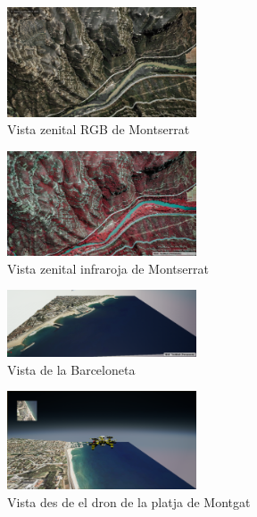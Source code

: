 \documentclass[10pt,a4paper,twocolumn,twoside]{article}
\begin{document}
\begin{figure}[!h]
\centering
  	\includegraphics[width=0.5\textwidth]{cenitalview}
	\caption{Vista zenital RGB de Montserrat}
	\label{fig-cenitalview}
\end{figure}

\begin{figure}[!h]
\centering
  	\includegraphics[width=0.5\textwidth]{cenitalviewir}
	\caption{Vista zenital infraroja de Montserrat}
	\label{fig-montserratir}
\end{figure}

\begin{figure}[!h]
\centering
  	\includegraphics[width=0.5\textwidth]{barceloneta}
	\caption{Vista de la Barceloneta}
	\label{fig-barceloneta}
\end{figure}

\begin{figure}[!h]
\centering
  	\includegraphics[width=0.5\textwidth]{simulator_example}
	\caption{Vista des de el dron de la platja de Montgat}
	\label{fig-viewdrone}
\end{figure}
\end{document}
